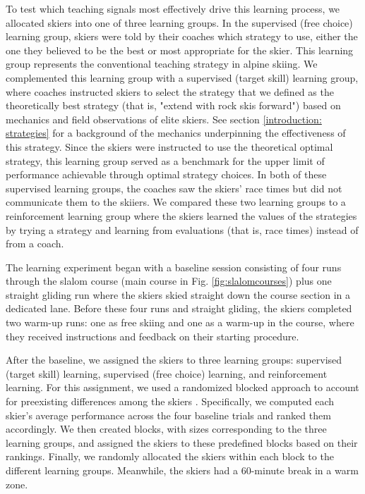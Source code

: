 To test which teaching signals most effectively drive this learning process, we allocated skiers into one of three learning groups. In the supervised (free choice) learning group, skiers were told by their coaches which strategy to use, either the one they believed to be the best or most appropriate for the skier. This learning group represents the conventional teaching strategy in alpine skiing. We complemented this learning group with a supervised (target skill) learning group, where coaches instructed skiers to select the strategy that we defined as the theoretically best strategy (that is, "extend with rock skis forward") based on mechanics and field observations of elite skiers. See section \ref{introduction: strategies} for a background of the mechanics underpinning the effectiveness of this strategy. Since the skiers were instructed to use the theoretical optimal strategy, this learning group served as a benchmark for the upper limit of performance achievable through optimal strategy choices. In both of these supervised learning groups, the coaches saw the skiers’ race times but did not communicate them to the skiiers. We compared these two learning groups to a reinforcement learning group where the skiers learned the values of the strategies by trying a strategy and learning from evaluations (that is, race times) instead of from a coach.

The learning experiment began with a baseline session consisting of four runs through the slalom course (main course in Fig. \ref{fig:slalomcourses}) plus one straight gliding run where the skiers skied straight down the course section in a dedicated lane. Before these four runs and straight gliding, the skiers completed two warm-up runs: one as free skiing and one as a warm-up in the course, where they received instructions and feedback on their starting procedure. 

After the baseline, we assigned the skiers to three learning groups: supervised (target skill) learning, supervised (free choice) learning, and reinforcement learning. For this assignment, we used a randomized blocked approach to account for preexisting differences among the skiers \cite{maxwell_designing_2017}. Specifically, we computed each skier’s average performance across the four baseline trials and ranked them accordingly. We then created blocks, with sizes corresponding to the three learning groups, and assigned the skiers to these predefined blocks based on their rankings. Finally, we randomly allocated the skiers within each block to the different learning groups. Meanwhile, the skiers had a 60-minute break in a warm zone. 

